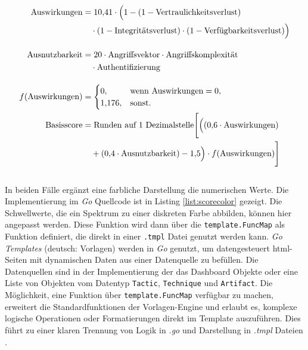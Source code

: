 \begin{align*}
    \text{Auswirkungen}    & = 10{,}41 \cdot \Big( 1
    - (1 - \text{Vertraulichkeitsverlust}) \notag                                      \\
                           & \quad \cdot (1 - \text{Integritätsverlust})
    \cdot (1 - \text{Verfügbarkeitsverlust}) \Big) \notag                              \\[10pt]
    \text{Ausnutzbarkeit}  & = 20 \cdot \text{Angriffsvektor}
    \cdot \text{Angriffskomplexität} \notag                                            \\
                           & \quad \cdot \text{Authentifizierung} \notag               \\[10pt]
    f(\text{Auswirkungen}) & =
    \begin{cases}
        0,       & \text{wenn Auswirkungen} = 0, \\
        1{,}176, & \text{sonst.}
    \end{cases}                                           \\
    \text{Basisscore}      & = \text{Runden auf 1 Dezimalstelle} \Bigg[ \Big(
    (0{,}6 \cdot \text{Auswirkungen}) \notag                                           \\
                           & \quad + (0{,}4 \cdot \text{Ausnutzbarkeit}) - 1{,}5 \Big)
    \cdot f(\text{Auswirkungen}) \Bigg] \notag                                         \\[10pt]
\end{align*}

\par In beiden Fälle ergänzt eine farbliche Darstellung die numerischen Werte. Die Implementierung im \textit{Go} Quellcode ist in Listing \ref{list:scorecolor} gezeigt. Die Schwellwerte, die ein Spektrum zu einer diskreten Farbe abbilden, können hier angepasst werden. Diese Funktion wird dann über die \verb|template.FuncMap| als Funktion definiert, die direkt in einer \verb|.tmpl| Datei genutzt werden kann. \textit{Go Templates} (deutsch: Vorlagen) werden in \textit{Go} genutzt, um datengesteuert \gls{html}-Seiten mit dynamischen Daten aus einer Datenquelle zu befüllen. Die Datenquellen sind in der Implementierung der das Dashboard Objekte oder eine Liste von Objekten vom Datentyp \verb|Tactic|, \verb|Technique| und \verb|Artifact|. Die Möglichkeit, eine Funktion über \verb|template.FuncMap| verfügbar zu machen, erweitert die Standardfunktionen der Vorlagen-Engine und erlaubt es, komplexe logische Operationen oder Formatierungen direkt im Template auszuführen. Dies führt zu einer klaren Trennung von Logik in \textit{.go} und Darstellung in \textit{.tmpl} Dateien \autocite{TemplatePackageText}.

